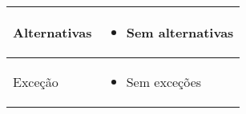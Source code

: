 \begin{quadro}[H]
\begin{tabular}{|p{3cm}|p{11cm}|}
        \hline
        Alternativas   &
        \begin{itemize}
            \item Sem alternativas
        \end{itemize}                                                                            \\
        \hline
        Exceção        &
        \begin{itemize}
            \item Sem exceções
        \end{itemize}                                                                            \\
        \hline
    \end{tabular}
\end{quadro}